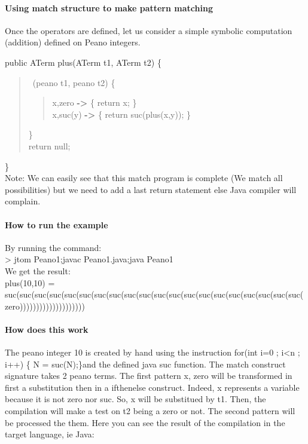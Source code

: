 \paragraph{Using match structure to make pattern matching}
Once the operators are defined, let us consider a simple symbolic
computation (addition) defined on Peano integers.

public ATerm plus(ATerm t1, ATerm t2) \{\\
\begin{quote}
 \match\ (peano t1, peano t2) \{\\
\begin{quote}
  x,zero   \textbf{->} \{ return x; \}\\
  x,suc(y) \textbf{->} \{ return suc(plus(x,y)); \}\\
\end{quote}
  \}\\
  return null;\\
\end{quote}
\}\\

Note: We can easily see that this match program is complete (We match
all possibilities) but we need to add a last return statement else
Java compiler will complain.
\paragraph{How to run the example}
By running the command:
\\> jtom Peano1;javac Peano1.java;java Peano1
\\We get the result:
\\plus(10,10) = suc(suc(suc(suc(suc(suc(suc(suc(suc(suc(suc(suc(suc(suc(suc(suc(suc(suc(suc(suc(zero))))))))))))))))))))

\paragraph{How does this work}
The peano integer 10 is created by hand using the instruction
\textsf{for(int i=0 ; i<n ; i++) \{ N = suc(N);\}}and the defined java
suc function.
The match construct signature takes 2 peano terms. The first pattern
{x, zero} will be transformed in first a substitution then in a
ifthenelse construct. Indeed, x represents a variable because it is
not zero nor suc. So, x will be substitued by t1. Then, the
compilation will make a test on t2 being a zero or not. The second
pattern will be processed the them.
Here you can see the result of the compilation in the target language,
ie Java:


